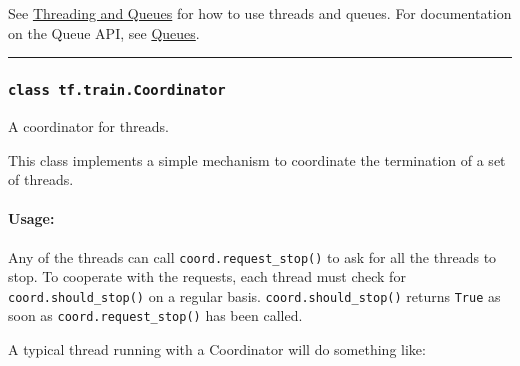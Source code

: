 See \href{../../how_tos/threading_and_queues/index.md}{Threading and
Queues} for how to use threads and queues. For documentation on the
Queue API, see \href{../../api_docs/python/io_ops.md\#queues}{Queues}.

\begin{center}\rule{0.5\linewidth}{\linethickness}\end{center}

\subsubsection{\texorpdfstring{\texttt{class\ tf.train.Coordinator}
}{class tf.train.Coordinator }}\label{class-tf.train.coordinator}

A coordinator for threads.

This class implements a simple mechanism to coordinate the termination
of a set of threads.

\paragraph{Usage: }\label{usage-1}

\begin{Shaded}
\begin{Highlighting}[]
\OperatorTok{=} 
\end{Highlighting}
\end{Shaded}

Any of the threads can call \texttt{coord.request\_stop()} to ask for
all the threads to stop. To cooperate with the requests, each thread
must check for \texttt{coord.should\_stop()} on a regular basis.
\texttt{coord.should\_stop()} returns \texttt{True} as soon as
\texttt{coord.request\_stop()} has been called.

A typical thread running with a Coordinator will do something like:

\begin{Shaded}
\begin{Highlighting}[]
  
\end{Highlighting}
\end{Shaded}

